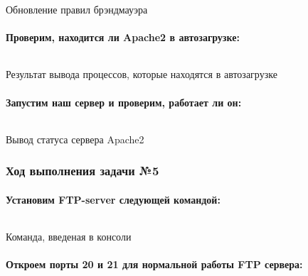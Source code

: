 \begin{code}
	\inputminted[breaklines=true, xleftmargin=1em, linenos, frame=single, framesep=10pt, fontsize=\footnotesize, firstline=1, lastline=33]{haskell}{fig/status1.bash}
	\caption{Обновление правил брэндмауэра}
\end{code}

\paragraph{Проверим, находится ли Apache2 в автозагрузке:}

\begin{code}
	\inputminted[breaklines=true, xleftmargin=1em, linenos, frame=single, framesep=10pt, fontsize=\footnotesize, firstline=1, lastline=33]{haskell}{fig/status2.bash}
	\caption{Результат вывода процессов, которые находятся в автозагрузке}
\end{code}


\paragraph{Запустим наш сервер и проверим, работает ли он:}

\begin{code}
	\inputminted[breaklines=true, xleftmargin=1em, linenos, frame=single, framesep=10pt, fontsize=\footnotesize, firstline=1, lastline=33]{haskell}{fig/apache2sys.txt}
	\caption{Вывод статуса сервера Apache2}
\end{code}

\subsubsection{Ход выполнения задачи №5}

\paragraph{Установим FTP-server следующей командой:}

\begin{code}
	\inputminted[breaklines=true, xleftmargin=1em, linenos, frame=single, framesep=10pt, fontsize=\footnotesize, firstline=1, lastline=33]{haskell}{fig/install_vsftpd.txt}
	\caption{Команда, введеная в консоли}
\end{code}

\newpage

\paragraph{Откроем порты 20 и 21 для нормальной работы FTP сервера:}

